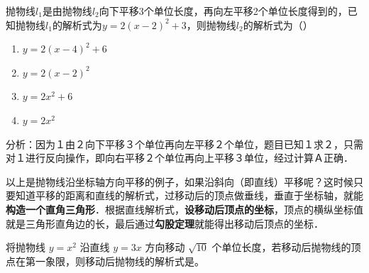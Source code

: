 \documentclass[lang=cn, 10pt, titlestyle=display, oneside, toc=twocol]{elegantbook}
\begin{document}
\begin{example}抛物线\( l_1 \)是由抛物线\( l_2 \)向下平移3个单位长度，再向左平移2个单位长度得到的，已知抛物线\( l_1 \)的解析式为\( y=2(x-2)^2+3 \)，则抛物线\( l_2 \)的解析式为（\hspace{3.5em}）

\begin{enumerate}[label=\Alph*.]
    \item \( y=2(x-4)^2+6 \)
    \item \( y=2(x-2)^2 \)
    \item \( y=2x^2+6 \)
    \item \( y=2x^2 \)
\end{enumerate}
\end{example}
\begin{solution}
    分析：因为１由２向下平移３个单位再向左平移２个单位，题目已知１求２，只需对１进行反向操作，即向右平移２个单位再向上平移３单位，经过计算Ａ正确．
\end{solution}
以上是抛物线沿坐标轴方向平移的例子，如果沿斜向（即直线）平移呢？这时候只要知道平移的距离和直线的解析式，过移动后的顶点做垂线，垂直于坐标轴，就能\textbf{构造一个直角三角形}．根据直线解析式，\textbf{设移动后顶点的坐标}，顶点的横纵坐标值就是三角形直角边的长，最后通过\textbf{勾股定理}就能得出移动后顶点的坐标．
\begin{example}
    将抛物线 \( y = x^2 \) 沿直线 \( y = 3x \) 方向移动 \(\sqrt{10}\) 个单位长度，若移动后抛物线的顶点在第一象限，则移动后抛物线的解析式是\underline{\hspace{4em}}。
\end{example}
\end{document}
